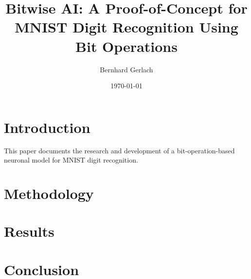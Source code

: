 \documentclass{article}
\title{Bitwise AI: A Proof-of-Concept for MNIST Digit Recognition Using Bit Operations}
\author{Bernhard Gerlach}
\date{\today}
\begin{document}
\maketitle

\section{Introduction}
This paper documents the research and development of a bit-operation-based neuronal model for MNIST digit recognition.

\section{Methodology}

\section{Results}

\section{Conclusion}
\end{document}
